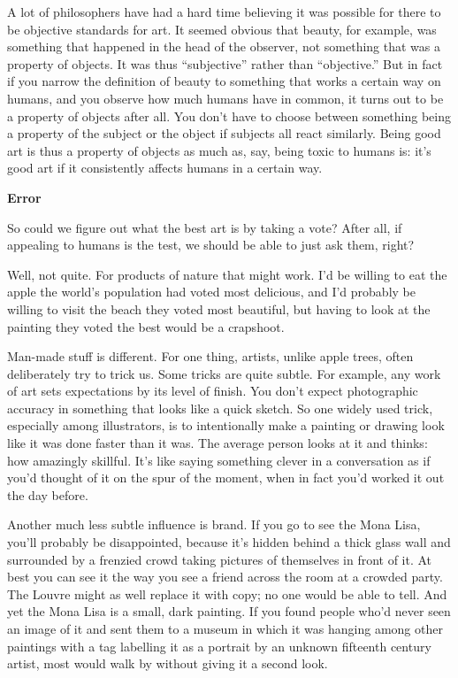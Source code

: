 \documentclass[12pt]{book}
\begin{document}
A lot of philosophers have had a hard time believing it was possible for
there to be objective standards for art. It seemed obvious that beauty,
for example, was something that happened in the head of the observer,
not something that was a property of objects. It was thus ``subjective''
rather than ``objective.'' But in fact if you narrow the definition of
beauty to something that works a certain way on humans, and you observe
how much humans have in common, it turns out to be a property of objects
after all. You don't have to choose between something being a property
of the subject or the object if subjects all react similarly. Being good
art is thus a property of objects as much as, say, being toxic to humans
is: it's good art if it consistently affects humans in a certain way.

\textbf{Error}

So could we figure out what the best art is by taking a vote? After all,
if appealing to humans is the test, we should be able to just ask them,
right?

Well, not quite. For products of nature that might work. I'd be willing
to eat the apple the world's population had voted most delicious, and
I'd probably be willing to visit the beach they voted most beautiful,
but having to look at the painting they voted the best would be a
crapshoot.

Man-made stuff is different. For one thing, artists, unlike apple trees,
often deliberately try to trick us. Some tricks are quite subtle. For
example, any work of art sets expectations by its level of finish. You
don't expect photographic accuracy in something that looks like a quick
sketch. So one widely used trick, especially among illustrators, is to
intentionally make a painting or drawing look like it was done faster
than it was. The average person looks at it and thinks: how amazingly
skillful. It's like saying something clever in a conversation as if
you'd thought of it on the spur of the moment, when in fact you'd worked
it out the day before.

Another much less subtle influence is brand. If you go to see the Mona
Lisa, you'll probably be disappointed, because it's hidden behind a
thick glass wall and surrounded by a frenzied crowd taking pictures of
themselves in front of it. At best you can see it the way you see a
friend across the room at a crowded party. The Louvre might as well
replace it with copy; no one would be able to tell. And yet the Mona
Lisa is a small, dark painting. If you found people who'd never seen an
image of it and sent them to a museum in which it was hanging among
other paintings with a tag labelling it as a portrait by an unknown
fifteenth century artist, most would walk by without giving it a second
look.
\end{document}
